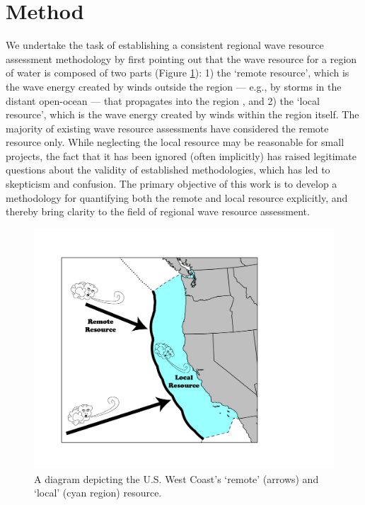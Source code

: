 \section{Method} \label{sec:method}

\hline


We undertake the task of establishing a consistent regional wave
resource assessment methodology by first pointing out that the wave
resource for a region of water is composed of two parts (Figure
\ref{fig:diagram:west-eez}): 1) the ‘remote resource’, which is the
wave energy created by winds outside the region — e.g., by storms in
the distant open-ocean — that propagates into the region
\citep{gunnQuantifyingGlobalWave2012,
hemerRevisedAssessmentAustralia2017}, and 2) the ‘local resource’,
which is the wave energy created by winds within the region
itself. The majority of existing wave resource assessments have
considered the remote resource only. While neglecting the local
resource may be reasonable for small projects, the fact that it has
been ignored (often implicitly) has raised legitimate questions about the validity of established methodologies, which has led to skepticism and confusion. The primary
objective of this work is to develop a methodology for quantifying
both the remote and local resource explicitly, and thereby bring clarity to the field of regional wave resource assessment.

\begin{figure}[ht]
  \centering
\includegraphics[width=0.9\linewidth]{../diagram/EEZ_contour03_edit01.png}
  \caption{A diagram depicting the U.S. West Coast’s ‘remote’ (arrows) and ‘local’ (cyan region) resource.}
  \label{fig:diagram:west-eez}
\end{figure}

